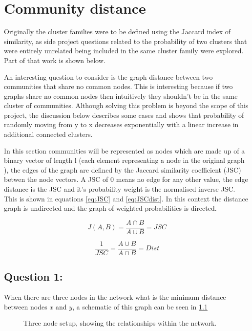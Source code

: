 \chapter{Community distance}
\label{community distance}
Originally the cluster families were to be defined using the Jaccard index of similarity, as side project questions related to the probability of two clusters that were entirely unrelated being included in the same cluster family were explored. Part of that work is shown below.

An interesting question to consider is the graph distance between two communities that share no common nodes. This is interesting because if two graphs share no common nodes then intuitively they shouldn't be in the same cluster of communities. Although solving this problem is beyond the scope of this project, the discussion below describes some cases and shows that probability of randomly moving from y to x decreases exponentially with a linear increase in additional connected clusters.

In this section communities will be represented as nodes which are made up of a binary vector of length l (each element representing a node in the original graph ), the edges of the graph are defined by the Jaccard similarity coefficient (JSC) betwen the node vectors. A JSC of 0 means no edge for any other value, the edge distance is the JSC and it's probability weight is the normalised inverse JSC. This  is shown in equations \ref{eq:JSC} and \ref{eq:JSCdist}. In this context the distance graph is undirected and the graph of weighted probabilities is directed.

\begin{equation}
    J(A,B)=\frac{A\cap B}{A\cup B}=JSC
    \label{eq:JSC}
\end{equation}


\begin{equation}
    \frac{1}{JSC}=\frac{A\cup B}{A\cap B}=Dist
    \label{eq:JSCdist}
\end{equation}


\section{Question 1:} When there are three nodes in the network what is the minimum distance between nodes $x$ and $y$, a schematic of this graph can be seen in \ref{net:threenodes}

\begin{figure}[ht]
    \centering
    
    \caption[Three Node graph]{Three node setup, showing the relationships within the network.}
    \label{net:threenodes}
\end{figure}

